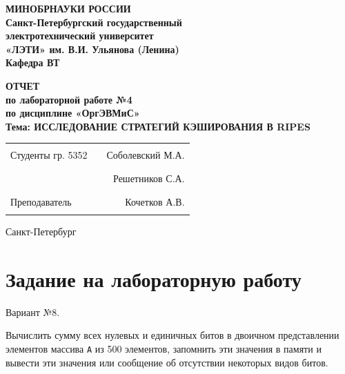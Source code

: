 \documentclass[12pt]{extarticle}
\begin{document}
\begin{center}
  \textbf{МИНОБРНАУКИ РОССИИ} \\
  \textbf{Санкт-Петербургский государственный} \\
  \textbf{электротехнический университет} \\
  \textbf{«ЛЭТИ» им. В.И. Ульянова (Ленина)} \\
  \textbf{Кафедра ВТ} \\
\end{center}

\vspace{0.25\textheight}

\begin{center}
\textbf{ОТЧЕТ} \\
\textbf{по лабораторной работе №4} \\
\textbf{по дисциплине «ОргЭВМиС»} \\
\textbf{Тема: ИССЛЕДОВАНИЕ СТРАТЕГИЙ КЭШИРОВАНИЯ В RIPES} \\
\end{center}

\vspace*{\fill}

\begin{center}
\begin{tabularx}{\textwidth}{ l X r }
 Студенты гр. 5352 & \rule{8cm}{0.2mm} & Соболевский М.А. \\
 & \rule{8cm}{0.2mm} & Решетников С.А. \\
 Преподаватель & \rule{8cm}{0.2mm} & Кочетков А.В. \\
\end{tabularx}
\end{center}

\vspace{3em}

\begin{center}
Санкт-Петербург\\
\the\year
\end{center}

\thispagestyle{empty}

\pagebreak

\section{Задание на лабораторную работу}

Вариант №8.

Вычислить сумму всех нулевых и единичных битов в двоичном представлении элементов массива \texttt{А} из 500 элементов, запомнить эти значения в памяти и вывести эти значения или сообщение об отсутствии некоторых видов
битов.
\end{document}
